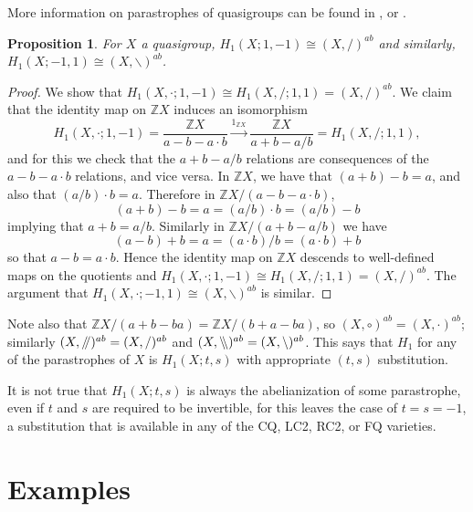 \documentclass[11pt]{amsart}
\newtheorem{proposition}[theorem]{Proposition}
\theoremstyle{definition}
\newcommand{\Z}{\mathbb{Z}}
\newcommand{\dslash}{/\mkern-5mu/}
\newcommand{\dbslash}{\backslash\mkern-5mu\backslash}
\begin{document}
 More information on parastrophes of quasigroups can be found in \cite[Section II.2]{Pfl2}, \cite[Section 1.2.2]{Shch} or \cite[Section 1.3]{Smi2}.

\begin{proposition}\label{prop:parastrophes}
    For $X$ a quasigroup, $H_1(X;1,-1) \cong (X,/)^{ab}$ and similarly, $H_1(X;-1,1) \cong (X,\backslash)^{ab}$. 
\end{proposition}

\begin{proof}
    We show that $H_1(X, \cdot;1,-1) \cong H_1(X,/;1,1) = (X,/)^{ab}$. We claim that the identity map on $\Z X$ induces an isomorphism \[ H_1(X,\cdot;1,-1) = \frac{\Z X}{a - b - a\cdot b} \stackrel{1_{\Z X}}{\longrightarrow} \frac{\Z X}{a + b - a/b} = H_1(X,/;1,1), \] and for this we check that the $a + b - a/b$ relations are consequences of the $a - b - a\cdot b$ relations, and vice versa. In $\Z X$, we have that $(a + b) - b = a$, and also that $(a/b) \cdot b = a$. Therefore in $\Z X / (a - b - a \cdot b)$, \[ (a + b) - b = a = (a/b) \cdot b = (a/b) - b \] implying that $a + b = a/b$. Similarly in $\Z X / (a + b - a/b)$ we have \[ (a - b) + b = a = (a \cdot b) / b = (a \cdot b) + b \] so that $a - b = a\cdot b$. Hence the identity map on $\Z X$ descends to well-defined maps on the quotients and $H_1(X, \cdot; 1, -1) \cong H_1(X, /; 1,1) = (X,/)^{ab}$. The argument that $H_1(X, \cdot; -1,1) \cong (X, \backslash)^{ab}$ is similar. 
\end{proof}

Note also that $\Z X/(a + b - ba) = \Z X/(b + a - ba)$, so $(X,\circ)^{ab} = (X,\cdot)^{ab}$; similarly $(X,\dslash)^{ab} = (X,/)^{ab}$ and $(X,\dbslash)^{ab} = (X,\backslash)^{ab}$. This says that $H_1$ for any of the parastrophes of $X$ is $H_1(X;t,s)$ with appropriate $(t,s)$ substitution.

It is not true that $H_1(X;t,s)$ is always the abelianization of some parastrophe, even if $t$ and $s$ are required to be invertible, for this leaves the case of $t = s = -1$, a substitution that is available in any of the CQ, LC2, RC2, or FQ varieties. 

\section{Examples}\label{S:examples}
\end{document}
